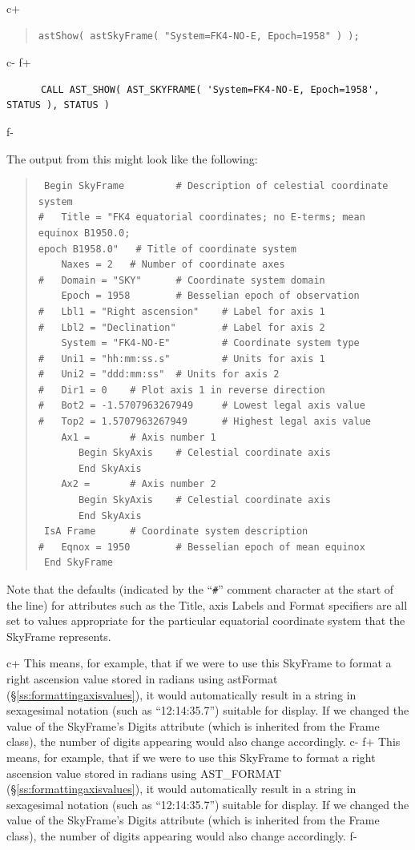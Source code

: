 \documentclass[twoside,11pt]{article}
\newcommand{\secref}[1]{\S\ref{#1}}
\newcommand{\secref}[1]{\ref{#1}}
\begin{document}
c+
\begin{quote}
\small
\begin{verbatim}
astShow( astSkyFrame( "System=FK4-NO-E, Epoch=1958" ) );
\end{verbatim}
\normalsize
\end{quote}
c-
f+
\small
\begin{verbatim}
      CALL AST_SHOW( AST_SKYFRAME( 'System=FK4-NO-E, Epoch=1958', STATUS ), STATUS )
\end{verbatim}
\normalsize
f-

The output from this might look like the following:

\begin{quote}
\begin{verbatim}
 Begin SkyFrame         # Description of celestial coordinate system
#   Title = "FK4 equatorial coordinates; no E-terms; mean equinox B1950.0;
epoch B1958.0"   # Title of coordinate system
    Naxes = 2   # Number of coordinate axes
#   Domain = "SKY"      # Coordinate system domain
    Epoch = 1958        # Besselian epoch of observation
#   Lbl1 = "Right ascension"    # Label for axis 1
#   Lbl2 = "Declination"        # Label for axis 2
    System = "FK4-NO-E"         # Coordinate system type
#   Uni1 = "hh:mm:ss.s"         # Units for axis 1
#   Uni2 = "ddd:mm:ss"  # Units for axis 2
#   Dir1 = 0    # Plot axis 1 in reverse direction
#   Bot2 = -1.5707963267949     # Lowest legal axis value
#   Top2 = 1.5707963267949      # Highest legal axis value
    Ax1 =       # Axis number 1
       Begin SkyAxis    # Celestial coordinate axis
       End SkyAxis
    Ax2 =       # Axis number 2
       Begin SkyAxis    # Celestial coordinate axis
       End SkyAxis
 IsA Frame      # Coordinate system description
#   Eqnox = 1950        # Besselian epoch of mean equinox
 End SkyFrame
\end{verbatim}
\end{quote}

Note that the defaults (indicated by the ``\verb?#?'' comment
character at the start of the line) for attributes such as the Title,
axis Labels and Format specifiers are all set to values appropriate
for the particular equatorial coordinate system that the SkyFrame
represents.

c+
This means, for example, that if we were to use this SkyFrame to
format a right ascension value stored in radians using astFormat
(\secref{ss:formattingaxisvalues}), it would automatically result in a
string in sexagesimal notation (such as ``12:14:35.7'') suitable for
display.  If we changed the value of the SkyFrame's Digits attribute
(which is inherited from the Frame class), the number of digits
appearing would also change accordingly.
c-
f+
This means, for example, that if we were to use this SkyFrame to
format a right ascension value stored in radians using AST\_FORMAT
(\secref{ss:formattingaxisvalues}), it would automatically result in a
string in sexagesimal notation (such as ``12:14:35.7'') suitable for
display.  If we changed the value of the SkyFrame's Digits attribute
(which is inherited from the Frame class), the number of digits
appearing would also change accordingly.
f-
\end{document}
